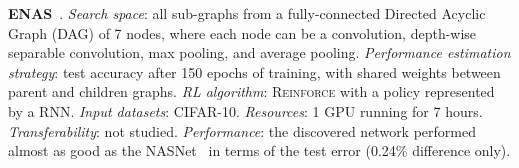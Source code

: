 \textbf{ENAS}~\citep{ENAS}. \emph{Search space}: all sub-graphs from a fully-connected Directed Acyclic Graph (DAG) of 7 nodes, where each node can be a convolution, depth-wise separable convolution, max pooling, and average pooling. \emph{Performance estimation strategy}: test accuracy after 150 epochs of training, with shared weights between parent and children graphs. \emph{RL algorithm}: \textsc{Reinforce} with a policy represented by a RNN. \emph{Input datasets}: CIFAR-10. \emph{Resources}: 1 GPU running for 7 hours. \emph{Transferability}: not studied. \emph{Performance}: the discovered network performed almost as good as the NASNet~\citep{ZophNAS2} in terms of the test error (0.24\% difference only).


